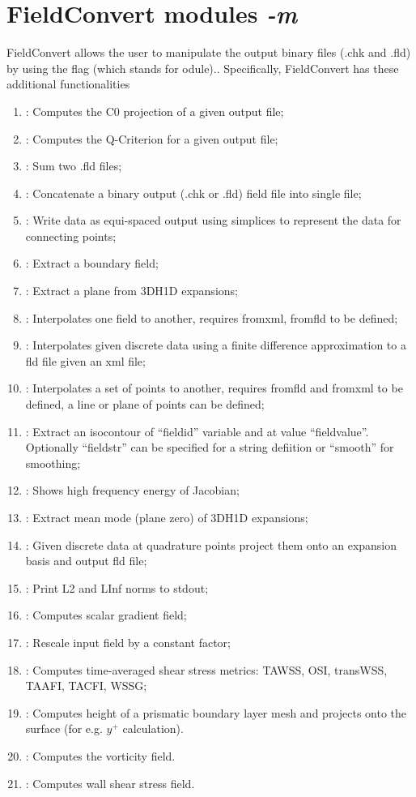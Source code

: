 \section{FieldConvert modules \textit{-m}}
FieldConvert allows the user to manipulate the \nekpp output 
binary files (.chk and .fld) by using the flag  (which 
stands for odule).. 
Specifically, FieldConvert has these additional functionalities
%
\begin{enumerate}
\item {}: Computes the C0 projection of a given output file;
\item {}: Computes the Q-Criterion for a given output file;
\item {}: Sum two .fld files;
\item {}: Concatenate a \nekpp binary output (.chk or .fld) field file into single file;
\item {}: Write data as equi-spaced output using simplices to represent the data for connecting points;
\item {}: Extract a boundary field;
\item {}: Extract a plane from 3DH1D expansions;
\item {}: Interpolates one field to another, requires fromxml, fromfld to be defined;
\item {}: Interpolates given discrete data using a finite difference approximation to a fld file given an xml file;
\item {}: Interpolates a set of points to another, requires fromfld and fromxml to be defined, a line or plane of points can be defined;
\item {}: Extract an isocontour of ``fieldid'' variable and at value ``fieldvalue''. Optionally ``fieldstr'' can be specified for a string defiition or ``smooth'' for smoothing; 
\item {}: Shows high frequency energy of Jacobian;
\item {}: Extract mean mode (plane zero) of 3DH1D expansions;
\item {}: Given discrete data at quadrature points
  project them onto an expansion basis and output fld file; 
\item {}: Print L2 and LInf norms to stdout;
\item {}: Computes scalar gradient field;
\item {}: Rescale input field by a constant factor;
\item {}: Computes time-averaged shear stress metrics: TAWSS, OSI, transWSS, TAAFI, TACFI, WSSG;
\item {}: Computes height of a prismatic boundary layer mesh and projects onto the surface (for e.g. $y^+$ calculation).
\item {}: Computes the vorticity field.
\item {}: Computes wall shear stress field.
\end{enumerate}
